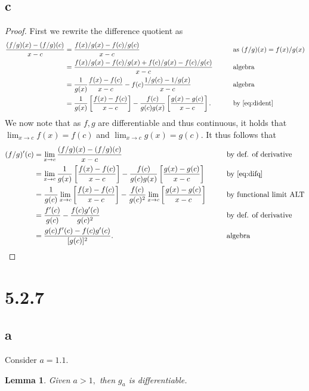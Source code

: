 \documentclass[10pt]{article}
\newtheorem{lemma}[]{Lemma}
\begin{document}
\subsection*{c}
\begin{proof}
    First we rewrite the difference quotient as
    \begin{alignat}{2}
        \frac{(f/g)(x)-(f/g)(c)}{x-c} &= \frac{f(x)/g(x)-f(c)/g(c)}{x-c} &&\text{as }(f/g)(x)=f(x)/g(x)\nonumber\\
        &= \frac{f(x)/g(x)-f(c)/g(x)+f(c)/g(x)-f(c)/g(c)}{x-c} \qquad&&\text{algebra}\nonumber\\
        &=\frac{1}{g(x)}\frac{f(x)-f(c)}{x-c}-f(c)\frac{1/g(c)-1/g(x)}{x-c} &&\text{algebra}\nonumber\\
        &=\frac{1}{g(x)}\left [ \frac{f(x)-f(c)}{x-c}\right ] - \frac{f(c)}{g(c)g(x)}\left [ \frac{g(x)-g(c)}{x-c}\right ]. &&\text{by \eqref{eq:dident}} \label{eq:difq}
    \end{alignat}
    We now note that as $f,g$ are differentiable and thus continuous, it holds that $\lim_{x\to c}f(x)=f(c)$ and $\lim_{x\to c}g(x)=g(c).$ It thus follows that
    \begin{alignat*}{2}
        (f/g)'(c)&=\lim_{x\to c}  \frac{(f/g)(x)-(f/g)(c)}{x-c} &&\text{by def. of derivative}\\
        &= \lim_{x\to c}\frac{1}{g(x)}\left [ \frac{f(x)-f(c)}{x-c}\right ] - \frac{f(c)}{g(c)g(x)}\left [ \frac{g(x)-g(c)}{x-c}\right ] \qquad&&\text{by \eqref{eq:difq}}\\
        &= \frac{1}{g(c)}\lim_{x\to c}\left [\frac{f(x)-f(c)}{x-c} \right ] - \frac{f(c)}{g(c)^2}\lim_{x\to c}\left [\frac{g(x)-g(c)}{x-c}\right ] &&\text{by functional limit ALT}\\
        &=\frac{f'(c)}{g(c)}-\frac{f(c)g'(c)}{g(c)^2} &&\text{by def. of derivative}\\
        &=\frac{g(c)f'(c)-f(c)g'(c)}{[g(c)]^2}. &&\text{algebra}
    \end{alignat*}
\end{proof}

\section*{5.2.7}
\subsection*{a}
Consider $a=1.1.$ 
\begin{lemma} \label{lem:1}
    Given $a>1,$ then $g_a$ is differentiable.
\end{lemma}
\end{document}

